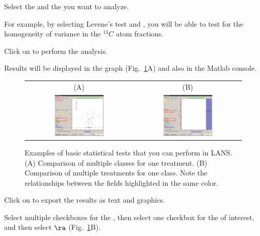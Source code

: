 \s Select the  and the  you want to analyze.

\bul For example, by selecting Levene's test and , you will be able to test for the homogeneity of variance in the ${}^{13}C$ atom fractions.

\s Click on  to perform the analysis. 

\bul Results will be displayed in the graph (Fig.~\ref{fig:lans-statistics}A) and also in the Matlab console.

\begin{figure}[!th]
\centering
\begin{tabular}{cc}
(A) & (B) \\
\includegraphics[width=0.48\textwidth, valign=t]{figs3/LANS-statistics1}
&
\includegraphics[width=0.48\textwidth, valign=t]{figs3/LANS-statistics2}
\end{tabular}
\caption{\label{fig:lans-statistics}%
Examples of basic statistical tests that you can perform in LANS. (A) Comparison of multiple classes for one treatment. (B) Comparison of multiple treatments for one class. Note the relationships between the fields highlighted in the same color.}
\end{figure}

\s Click on  to export the results as text and graphics.


\s Select multiple checkboxes for the , then select one checkbox for the  of interest,  and then select  $\ra$  (Fig.~\ref{fig:lans-statistics}B).

